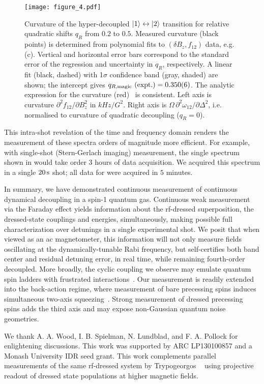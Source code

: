 \documentclass[aps,prl,reprint,superscriptaddress,floatfix]{revtex4-1}
\begin{document}
\begin{figure}
    \texttt{[image: figure\_4.pdf]}
    \caption{
    \label{fig:curvature_vs_qR}
        Curvature of the hyper-decoupled $\vert 1 \rangle  \leftrightarrow \vert 2 \rangle $ transition for relative quadratic shifts $q_R$ from $0.2$ to $0.5$.
        Measured curvature (black points) is determined from polynomial fits to $(\delta B_z, f_{12})$ data, e.g. (c).
        Vertical and horizontal error bars correspond to the standard error of the regression and uncertainty in $q_R$, respectively.
        A linear fit (black, dashed) with 1$\sigma$ confidence band (gray, shaded) are shown; the intercept gives $q_{R,\text{magic}}\text{ (expt.)} = 0.350(6)$.
        The analytic expression for the curvature (red)~\cite{Note1} is consistent.
        Left axis is curvature $\partial^2 f_{12}/\partial B_z^2$ in  $\unit{kHz/G^2}$.
        Right axis is $\Omega\, \partial^2\omega_{12}/\partial \Delta^2$, i.e. normalised to curvature of quadratic decoupling ($q_R=0$).
    }
\end{figure}

This intra-shot revelation of the time and frequency domain renders the measurement of these spectra orders of magnitude more efficient.
For example, with single-shot (Stern-Gerlach imaging) measurement, the single spectrum shown in  would take order 3 hours of data acquisition.
We acquired this spectrum in a single $\unit[20]{s}$ shot; all data for  were acquired in $5$ minutes.

In summary, we have demonstrated continuous measurement of continuous dynamical decoupling in a spin-1 quantum gas.
Continuous weak measurement via the Faraday effect yields information about the rf-dressed superposition, the dressed-state couplings and energies, simultaneously, making possible full characterization over detunings in a single experimental shot.
We posit that when viewed as an ac magnetometer, this information will not only measure fields oscillating at the dynamically-tunable Rabi frequency, but self-certifies both band center and residual detuning error, in real time, while remaining fourth-order decoupled.
More broadly, the cyclic coupling we observe may emulate quantum spin ladders with frustrated interactions~\cite{mikeska_one-dimensional_2004}.
Our measurement is readily extended into the back-action regime, where
measurement of bare precessing spins induces simultaneous two-axis squeezing~\cite{colangelo_simultaneous_2017}.
Strong measurement of dressed precessing spins adds the third axis and may expose non-Gaussian quantum noise geometries.

We thank A. A. Wood, I. B. Spielman, N. Lundblad, and F. A. Pollock for enlightening discussions.
This work was supported by ARC LP130100857 and a Monash University IDR seed grant. 
This work complements parallel measurements of the same rf-dressed system by Trypogeorgos \etal~\cite{trypogeorgos_synthetic_2017} using projective readout of dressed state populations at higher magnetic fields.


\end{document}
